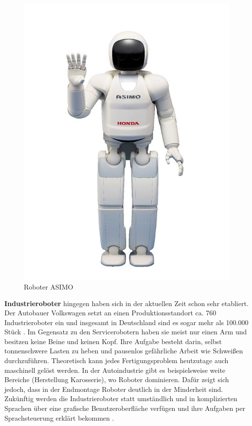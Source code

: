\begin{figure}[H]						
	\centering							
	\includegraphics[scale=0.5]{Bilder/asimo.jpg}			
	\caption{Roboter ASIMO}						
	\label{f:asimo}						
\end{figure}

\textbf{Industrieroboter} hingegen haben sich in der aktuellen Zeit schon sehr etabliert. Der Autobauer Volkswagen setzt an einen Produktionsstandort ca. 760 Industrieroboter ein und insgesamt in Deutschland sind es sogar mehr als 100.000 Stück \cite{Haun2007}. Im Gegensatz zu den Servicerobotern haben sie meist nur einen Arm und besitzen keine Beine und keinen Kopf. Ihre Aufgabe besteht darin, selbst tonnenschwere Lasten zu heben und pausenlos gefährliche Arbeit wie  Schweißen durchzuführen. 
Theoretisch kann jedes Fertigungsproblem heutzutage auch maschinell gelöst werden. In der Autoindustrie gibt es beispielsweise weite Bereiche (Herstellung Karosserie), wo Roboter dominieren. Dafür zeigt sich jedoch, dass in der Endmontage Roboter deutlich in der Minderheit sind. Zukünftig werden die Industrieroboter statt umständlich und in komplizierten Sprachen über eine grafische Benutzeroberfläche verfügen und ihre Aufgaben per Sprachsteuerung erklärt bekommen \cite{Haun2007}.

